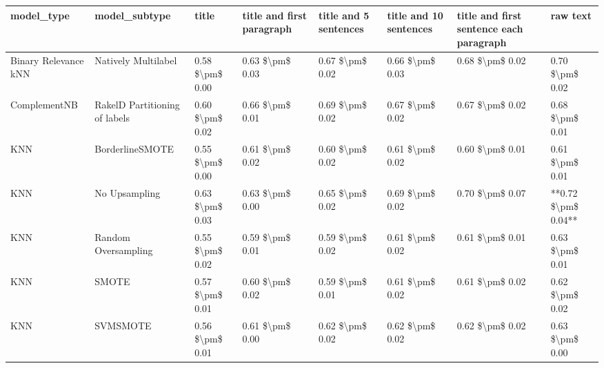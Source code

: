 \begin{tabular}{llllllll}
\toprule
                     model\_type &                 model\_subtype &           title & title and first paragraph & title and 5 sentences & title and 10 sentences & title and first sentence each paragraph &            raw text \\
\midrule
           Binary Relevance kNN &           Natively Multilabel & 0.58 \$\textbackslash pm\$ 0.00 &           0.63 \$\textbackslash pm\$ 0.03 &       0.67 \$\textbackslash pm\$ 0.02 &        0.66 \$\textbackslash pm\$ 0.03 &                         0.68 \$\textbackslash pm\$ 0.02 &     0.70 \$\textbackslash pm\$ 0.02 \\
                   ComplementNB & RakelD Partitioning of labels & 0.60 \$\textbackslash pm\$ 0.02 &           0.66 \$\textbackslash pm\$ 0.01 &       0.69 \$\textbackslash pm\$ 0.02 &        0.67 \$\textbackslash pm\$ 0.02 &                         0.67 \$\textbackslash pm\$ 0.02 &     0.68 \$\textbackslash pm\$ 0.01 \\
                            KNN &               BorderlineSMOTE & 0.55 \$\textbackslash pm\$ 0.00 &           0.61 \$\textbackslash pm\$ 0.02 &       0.60 \$\textbackslash pm\$ 0.02 &        0.61 \$\textbackslash pm\$ 0.02 &                         0.60 \$\textbackslash pm\$ 0.01 &     0.61 \$\textbackslash pm\$ 0.01 \\
                            KNN &                 No Upsampling & 0.63 \$\textbackslash pm\$ 0.03 &           0.63 \$\textbackslash pm\$ 0.00 &       0.65 \$\textbackslash pm\$ 0.02 &        0.69 \$\textbackslash pm\$ 0.02 &                         0.70 \$\textbackslash pm\$ 0.07 & **0.72 \$\textbackslash pm\$ 0.04** \\
                            KNN &           Random Oversampling & 0.55 \$\textbackslash pm\$ 0.02 &           0.59 \$\textbackslash pm\$ 0.01 &       0.59 \$\textbackslash pm\$ 0.02 &        0.61 \$\textbackslash pm\$ 0.02 &                         0.61 \$\textbackslash pm\$ 0.01 &     0.63 \$\textbackslash pm\$ 0.01 \\
                            KNN &                         SMOTE & 0.57 \$\textbackslash pm\$ 0.01 &           0.60 \$\textbackslash pm\$ 0.02 &       0.59 \$\textbackslash pm\$ 0.01 &        0.61 \$\textbackslash pm\$ 0.02 &                         0.61 \$\textbackslash pm\$ 0.02 &     0.62 \$\textbackslash pm\$ 0.02 \\
                            KNN &                      SVMSMOTE & 0.56 \$\textbackslash pm\$ 0.01 &           0.61 \$\textbackslash pm\$ 0.00 &       0.62 \$\textbackslash pm\$ 0.02 &        0.62 \$\textbackslash pm\$ 0.02 &                         0.62 \$\textbackslash pm\$ 0.02 &     0.63 \$\textbackslash pm\$ 0.00 \\

\end{tabular}
